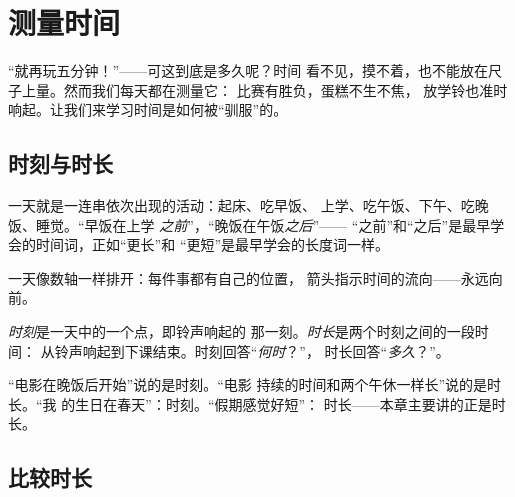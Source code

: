 \chapter{测量时间}\label{ch:g2:measuring-time}

“就再玩五分钟！”——可这到底是多久呢？时间
看不见，摸不着，也不能放在尺子上量。然而我们每天都在测量它：
比赛有胜负，蛋糕不生不焦，
放学铃也准时响起。让我们来学习时间是如何被“驯服”的。

\section{时刻与时长}

\begin{example}[一天的顺序]\label{ex:g2:measuring-time:order}
一天就是一连串依次出现的活动：起床、吃早饭、
上学、吃午饭、下午、吃晚饭、睡觉。“早饭在上学
\emph{之前}”，“晚饭在午饭\emph{之后}”——
“之前”和“之后”是最早学会的时间词，正如“更长”和
“更短”是最早学会的长度词一样。
\end{example}

\begin{omfigure}

{\small 一天像数轴一样排开：每件事都有自己的位置，
箭头指示时间的流向——永远向前。}
\end{omfigure}

\begin{definition}[时长]\label{def:g2:measuring-time:duration}
\emph{时刻}是一天中的一个点，即铃声响起的
那一刻。\emph{时长}是两个时刻之间的一段时间：
从铃声响起到下课结束。时刻回答“\emph{何时}？”，
时长回答“\emph{多久}？”。
\end{definition}

\begin{example}[何时还是多久？]\label{ex:g2:measuring-time:whenhowlong}
“电影在晚饭后开始”说的是时刻。“电影
持续的时间和两个午休一样长”说的是时长。“我
的生日在春天”：时刻。“假期感觉好短”：
时长——本章主要讲的正是时长。
\end{example}

\section{比较时长}

